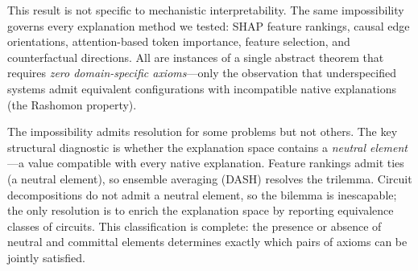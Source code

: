 \documentclass{article}
\begin{document}
This result is not specific to mechanistic interpretability.
The same impossibility governs every explanation method we tested:
SHAP feature rankings, causal edge orientations, attention-based token
importance, feature selection, and counterfactual directions.
All are instances of a single abstract theorem that requires
\emph{zero domain-specific axioms}---only the observation that underspecified
systems admit equivalent configurations with incompatible native explanations
(the Rashomon property).

The impossibility admits resolution for some problems but not others.
The key structural diagnostic is whether the explanation space contains a
\emph{neutral element}---a value compatible with every native explanation.
Feature rankings admit ties (a neutral element), so ensemble averaging
(DASH) resolves the trilemma.
Circuit decompositions do not admit a neutral element, so the bilemma is
inescapable; the only resolution is to enrich the explanation space by
reporting equivalence classes of circuits.
This classification is complete: the presence or absence of neutral and
committal elements determines exactly which pairs of axioms can be jointly
satisfied.
\end{document}

